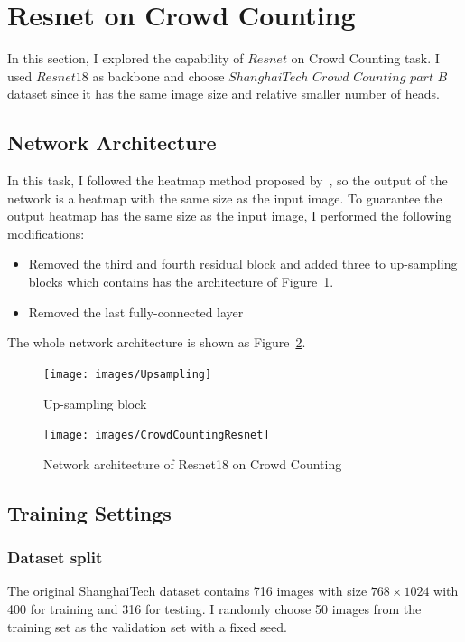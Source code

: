 \documentclass[10pt,twocolumn,letterpaper]{article}
\begin{document}
    \section{Resnet on Crowd Counting}
    In this section, I explored the capability of $Resnet$ on Crowd Counting task.
    I used $Resnet18$ as backbone and choose $ShanghaiTech$ $Crowd$ $Counting$ $part$ $B$ dataset since it has the same
    image size and relative smaller number of heads.

    \subsection{Network Architecture}
    In this task, I followed the heatmap method proposed by~\cite{zhang2016single}, so the output of the network is a heatmap with the same size as the input image.
    To guarantee the output heatmap has the same size as the input image, I performed the following modifications:
    \begin{itemize}
        \item Removed the third and fourth residual block and added three to up-sampling blocks which contains has the architecture of Figure~\ref{fig:up_sample_block}.
        \item Removed the last fully-connected layer
    \end{itemize}
    The whole network architecture is shown as Figure~\ref{fig:CrowdCountingResnet}.
    \begin{center}
        \begin{figure}
            \texttt{[image: images/Upsampling]}
            \caption{Up-sampling block}
            \label{fig:up_sample_block}
        \end{figure}
    \end{center}
    \begin{center}
        \begin{figure}
            \texttt{[image: images/CrowdCountingResnet]}
            \caption{Network architecture of Resnet18 on Crowd Counting}
            \label{fig:CrowdCountingResnet}
        \end{figure}
    \end{center}

    \subsection{Training Settings}

    \subsubsection{Dataset split}
    \par The original ShanghaiTech dataset contains 716 images with size $768\times 1024$ with 400 for training and 316 for testing.
    I randomly choose 50 images from the training set as the validation set with a fixed seed.
\end{document}
